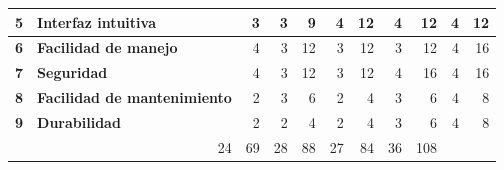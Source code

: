 \begin{table}[h]
{\begin{tabular}{|c|c|c|c|c|c|c|c|c|c|c|}
		\hline
		\textbf{5} & \multicolumn{1}{l|}{\textbf{Interfaz intuitiva}} & \multicolumn{1}{r|}{3} & \multicolumn{1}{r|}{\cellcolor[rgb]{ .949,  .863,  .859}3} & \multicolumn{1}{r|}{9} & \multicolumn{1}{r|}{\cellcolor[rgb]{ .863,  .902,  .945}4} & \multicolumn{1}{r|}{12} & \multicolumn{1}{r|}{\cellcolor[rgb]{ .922,  .945,  .871}4} & \multicolumn{1}{r|}{12} & \multicolumn{1}{r|}{\cellcolor[rgb]{ .992,  .914,  .851}4} & \multicolumn{1}{r|}{12} \bigstrut\\
		\hline
		\textbf{6} & \multicolumn{1}{l|}{\textbf{Facilidad de manejo }} & \multicolumn{1}{r|}{4} & \multicolumn{1}{r|}{\cellcolor[rgb]{ .949,  .863,  .859}3} & \multicolumn{1}{r|}{12} & \multicolumn{1}{r|}{\cellcolor[rgb]{ .863,  .902,  .945}3} & \multicolumn{1}{r|}{12} & \multicolumn{1}{r|}{\cellcolor[rgb]{ .922,  .945,  .871}3} & \multicolumn{1}{r|}{12} & \multicolumn{1}{r|}{\cellcolor[rgb]{ .992,  .914,  .851}4} & \multicolumn{1}{r|}{16} \bigstrut\\
		\hline
		\textbf{7} & \multicolumn{1}{l|}{\textbf{Seguridad}} & \multicolumn{1}{r|}{4} & \multicolumn{1}{r|}{\cellcolor[rgb]{ .949,  .863,  .859}3} & \multicolumn{1}{r|}{12} & \multicolumn{1}{r|}{\cellcolor[rgb]{ .863,  .902,  .945}3} & \multicolumn{1}{r|}{12} & \multicolumn{1}{r|}{\cellcolor[rgb]{ .922,  .945,  .871}4} & \multicolumn{1}{r|}{16} & \multicolumn{1}{r|}{\cellcolor[rgb]{ .992,  .914,  .851}4} & \multicolumn{1}{r|}{16} \bigstrut\\
		\hline
		\textbf{8} & \multicolumn{1}{l|}{\textbf{Facilidad de mantenimiento}} & \multicolumn{1}{r|}{2} & \multicolumn{1}{r|}{\cellcolor[rgb]{ .949,  .863,  .859}3} & \multicolumn{1}{r|}{6} & \multicolumn{1}{r|}{\cellcolor[rgb]{ .863,  .902,  .945}2} & \multicolumn{1}{r|}{4} & \multicolumn{1}{r|}{\cellcolor[rgb]{ .922,  .945,  .871}3} & \multicolumn{1}{r|}{6} & \multicolumn{1}{r|}{\cellcolor[rgb]{ .992,  .914,  .851}4} & \multicolumn{1}{r|}{8} \bigstrut\\
		\hline
		\textbf{9} & \multicolumn{1}{l|}{\textbf{Durabilidad}} & \multicolumn{1}{r|}{2} & \multicolumn{1}{r|}{\cellcolor[rgb]{ .949,  .863,  .859}2} & \multicolumn{1}{r|}{4} & \multicolumn{1}{r|}{\cellcolor[rgb]{ .863,  .902,  .945}2} & \multicolumn{1}{r|}{4} & \multicolumn{1}{r|}{\cellcolor[rgb]{ .922,  .945,  .871}3} & \multicolumn{1}{r|}{6} & \multicolumn{1}{r|}{\cellcolor[rgb]{ .992,  .914,  .851}4} & \multicolumn{1}{r|}{8} \bigstrut\\
		\hline
		\rowcolor[rgb]{ .851,  .851,  .851} \multicolumn{3}{|c|}{\textbf{Suma}} & \multicolumn{1}{r|}{24} & \multicolumn{1}{r|}{69} & \multicolumn{1}{r|}{28} & \multicolumn{1}{r|}{88} & \multicolumn{1}{r|}{27} & \multicolumn{1}{r|}{84} & \multicolumn{1}{r|}{36} & \multicolumn{1}{r|}{108} \bigstrut\\

\end{tabular}}
\end{table}
